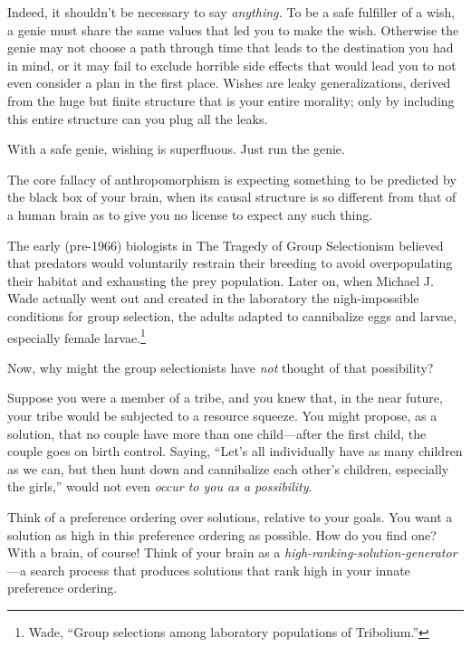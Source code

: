 {{{
 Indeed, it shouldn't be necessary to say
\textit{anything.} To be a safe fulfiller of a wish, a genie must share
the same values that led you to make the wish. Otherwise the genie may
not choose a path through time that leads to the destination you had in
mind, or it may fail to exclude horrible side effects that would lead
you to not even consider a plan in the first place. Wishes are leaky
generalizations, derived from the huge but finite structure that is
your entire morality; only by including this entire structure can you
plug all the leaks.}

{
 With a safe genie, wishing is superfluous. Just run the genie.}

\myendsectiontext


{
 The core fallacy of anthropomorphism is expecting something to be
predicted by the black box of your brain, when its causal structure is
so different from that of a human brain as to give you no license to
expect any such thing. }

{
 The early (pre-1966) biologists in The Tragedy of Group
Selectionism believed that predators would voluntarily restrain their
breeding to avoid overpopulating their habitat and exhausting the prey
population. Later on, when Michael J. Wade actually went out and
created in the laboratory the nigh-impossible conditions for group
selection, the adults adapted to cannibalize eggs and larvae,
especially female larvae.\footnote{Wade, ``Group selections among laboratory
populations of Tribolium.''}}

{
 Now, why might the group selectionists have \textit{not} thought
of that possibility?}

{
 Suppose you were a member of a tribe, and you knew that, in the
near future, your tribe would be subjected to a resource squeeze. You
might propose, as a solution, that no couple have more than one
child---after the first child, the couple goes on birth control.
Saying, ``Let's all individually have
as many children as we can, but then hunt down and cannibalize each
other's children, especially the
girls,'' would not even \textit{occur to you as a
possibility}.}

{
 Think of a preference ordering over solutions, relative to your
goals. You want a solution as high in this preference ordering as
possible. How do you find one? With a brain, of course! Think of your
brain as a \textit{high-ranking-solution-generator}{}---a search
process that produces solutions that rank high in your innate
preference ordering.}

}}
